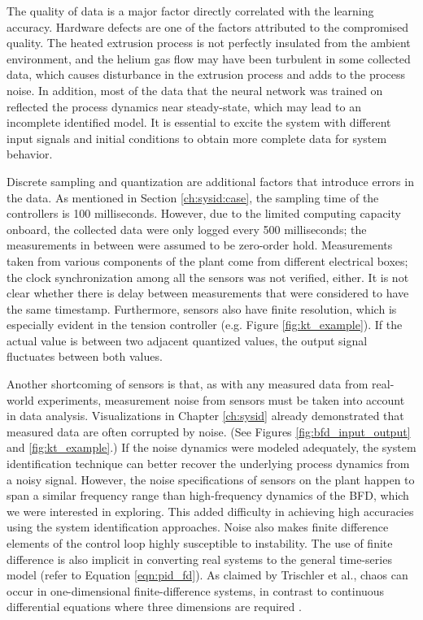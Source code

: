 The quality of data is a major factor directly correlated with the learning accuracy. Hardware defects are one of the factors attributed to the compromised quality. The heated extrusion process is not perfectly insulated from the ambient environment, and the helium gas flow may have been turbulent in some collected data, which causes disturbance in the extrusion process and adds to the process noise. In addition, most of the data that the neural network was trained on reflected the process dynamics near steady-state, which may lead to an incomplete identified model. It is essential to excite the system with different input signals and initial conditions to obtain more complete data for system behavior. 


Discrete sampling and quantization are additional factors that introduce errors in the data. As mentioned in Section \ref{ch:sysid:case}, the sampling time of the controllers is 100 milliseconds. However, due to the limited computing capacity onboard, the collected data were only logged every 500 milliseconds; the measurements in between were assumed to be zero-order hold. Measurements taken from various components of the plant come from different electrical boxes; the clock synchronization among all the sensors was not verified, either. It is not clear whether there is delay between measurements that were considered to have the same timestamp. Furthermore, sensors also have finite resolution, which is especially evident in the tension controller (e.g. Figure \ref{fig:kt_example}). If the actual value is between two adjacent quantized values, the output signal fluctuates between both values. 

Another shortcoming of sensors is that, as with any measured data from real-world experiments, measurement noise from sensors must be taken into account in data analysis. Visualizations in Chapter \ref{ch:sysid} already demonstrated that measured data are often corrupted by noise. (See Figures \ref{fig:bfd_input_output} and \ref{fig:kt_example}.) If the noise dynamics were modeled adequately, the system identification technique can better recover the underlying process dynamics from a noisy signal. However, the noise specifications of sensors on the plant happen to span a similar frequency range than high-frequency dynamics of the BFD, which we were interested in exploring. This added difficulty in achieving high accuracies using the system identification approaches. Noise also makes finite difference elements of the control loop highly susceptible to instability. %
The use of finite difference is also implicit in converting real systems to the general time-series model (refer to Equation \ref{eqn:pid_fd}). As claimed by Trischler et al., chaos can occur in one-dimensional finite-difference systems, in contrast to continuous differential equations where three dimensions are required \cite{trischler}.

